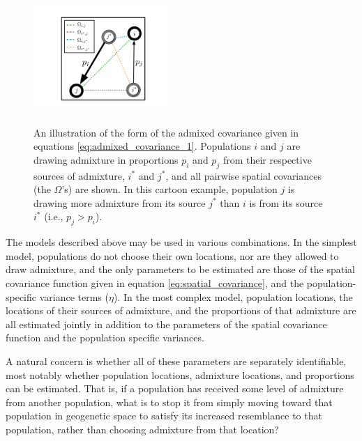 \documentclass[12pt]{article}
\newcommand{\identifyadmixsource}[1]{{#1^{*}}}
\newcommand{\plr}[1]{{\it\color{green}{(#1)}}}
\begin{document}
\begin{figure}[htp!]
	\centering
	\includegraphics[width=2in,height=2in]{figs/admix_cov_fig.pdf}
	\caption{An illustration of the form of the admixed covariance given in equations \eqref{eq:admixed_covariance_1}.  Populations $i$ and $j$ are drawing admixture in proportions $p_i$ and $p_j$ from their respective sources of admixture, $\identifyadmixsource{i}$ and $\identifyadmixsource{j}$, and all pairwise spatial covariances (the $\Omega$'s) are shown.  In this cartoon example, population $j$ is drawing more admixture from its source $\identifyadmixsource{j}$ than $i$ is from its source $\identifyadmixsource{i}$ (i.e., $p_j > p_i$).
        \plr{isn't $p_i>p_j$?}
    }
\label{sfig:admixed_cov_diagram}
\end{figure}


The models described above may be used in various combinations.  In the simplest model, populations do not choose their own locations, nor are they allowed to draw admixture, and the only parameters to be estimated are those of the spatial covariance function given in equation \eqref{eq:spatial_covariance}, and the population-specific variance terms ($\eta$).  In the most complex model, population locations, the locations of their sources of admixture, and the proportions of that admixture are all estimated jointly in addition to the parameters of the spatial covariance function and the population specific variances.  

A natural concern is whether all of these parameters are separately identifiable, most notably whether population locations, admixture locations, and proportions can be estimated. That is, if a population has received some level of admixture from another population, what is to stop it from simply moving toward that population in geogenetic space to satisfy its increased resemblance to that population, rather than choosing admixture from that location?
\end{document}
